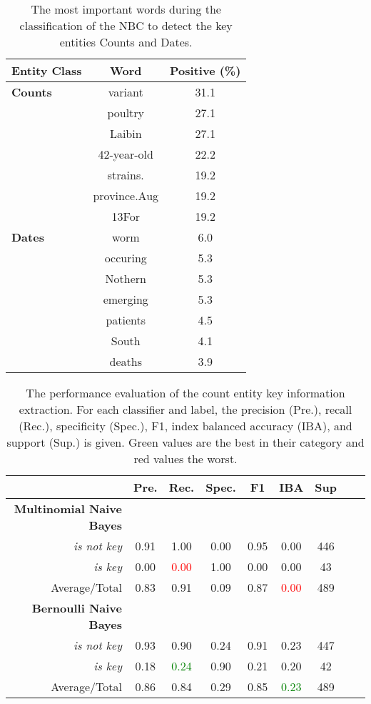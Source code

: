 \begin{table}
  \centering
  \caption{The most important words during the classification of the NBC to detect the key entities Counts and Dates.}
  \begin{tabular}{@{}lcc@{}}
    \toprule
    \textbf{Entity Class}& \textbf{Word} & \textbf{Positive (\%)}\\
    \midrule
    \textbf{Counts}& variant& 31.1\\
    & poultry& 27.1\\
    & Laibin& 27.1\\
    & 42-year-old& 22.2\\
    & strains.& 19.2\\
    & province.Aug& 19.2\\
    & 13For& 19.2\vspace{2mm}\\
    \textbf{Dates}
    & worm& 6.0\\
    & occuring& 5.3\\
    & Nothern& 5.3\\
    & emerging& 5.3\\
    & patients& 4.5\\
    & South& 4.1\\
    & deaths& 3.9\\
    \bottomrule
  \end{tabular}
\label{table:important_words}
\end{table}

\begin{table}
  \caption{The performance evaluation of the count entity key information extraction. For each classifier and label, the precision (Pre.), recall (Rec.), specificity (Spec.), F1, index balanced accuracy (IBA), and support (Sup.) is given. Green values are the best in their category and red values the worst.}
  \centering
  \begin{tabular}{@{}rcccccccc@{}}
    \toprule
     & \textbf{Pre.} & \textbf{Rec.} & \textbf{Spec.}
    & \textbf{F1} &  \textbf{IBA}& \textbf{Sup} \\
    \midrule
    \textbf{Multinomial Naive Bayes}\\
    \textsl{is not key}& 0.91& 1.00&  0.00& 0.95& 0.00& 446 \\
    \textsl{is key}& 0.00& \textcolor{red}{0.00}&  1.00& 0.00& 0.00& 43 \\
    Average/Total& 0.83& 0.91& 0.09& 0.87& \textcolor{red}{0.00}& 489 \vspace{2mm}\\
    \textbf{Bernoulli Naive Bayes}\\
    \textsl{is not key}& 0.93& 0.90&  0.24& 0.91& 0.23& 447 \\
    \textsl{is key}& 0.18& \textcolor{green}{0.24}&  0.90& 0.21& 0.20& 42 \\
    Average/Total& 0.86& 0.84& 0.29& 0.85& \textcolor{green}{0.23}& 489 \vspace{2mm}\\
    \bottomrule
  \end{tabular}
\label{table:keyword_performance_counts}
\end{table}

